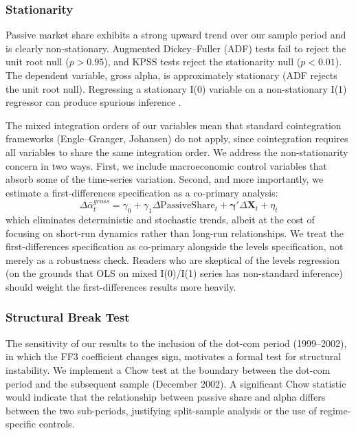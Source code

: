 \documentclass[11pt, a4paper]{article}
\begin{document}
\subsubsection{Stationarity}
\label{subsub:stationarity}

Passive market share exhibits a strong upward trend over our sample period and is clearly non-stationary. Augmented Dickey--Fuller (ADF) tests \parencite{dickey1979} fail to reject the unit root null ($p > 0.95$), and KPSS tests \parencite{kwiatkowski1992} reject the stationarity null ($p < 0.01$). The dependent variable, gross alpha, is approximately stationary (ADF rejects the unit root null). Regressing a stationary I(0) variable on a non-stationary I(1) regressor can produce spurious inference \parencite{phillips1986}.

The mixed integration orders of our variables mean that standard cointegration frameworks (Engle--Granger, Johansen) do not apply, since cointegration requires all variables to share the same integration order. We address the non-stationarity concern in two ways. First, we include macroeconomic control variables that absorb some of the time-series variation. Second, and more importantly, we estimate a first-differences specification as a co-primary analysis:
\begin{equation}
    \Delta \bar{\alpha}_{t}^{gross} = \gamma_0 + \gamma_1 \Delta \text{PassiveShare}_t + \boldsymbol{\gamma}' \Delta \mathbf{X}_t + \eta_t
    \label{eq:first_diff}
\end{equation}
which eliminates deterministic and stochastic trends, albeit at the cost of focusing on short-run dynamics rather than long-run relationships. We treat the first-differences specification as co-primary alongside the levels specification, not merely as a robustness check. Readers who are skeptical of the levels regression (on the grounds that OLS on mixed I(0)/I(1) series has non-standard inference) should weight the first-differences results more heavily.

\subsubsection{Structural Break Test}
\label{subsub:structural_break}

The sensitivity of our results to the inclusion of the dot-com period (1999--2002), in which the FF3 coefficient changes sign, motivates a formal test for structural instability. We implement a Chow test \parencite{chow1960} at the boundary between the dot-com period and the subsequent sample (December 2002). A significant Chow statistic would indicate that the relationship between passive share and alpha differs between the two sub-periods, justifying split-sample analysis or the use of regime-specific controls.
\end{document}
